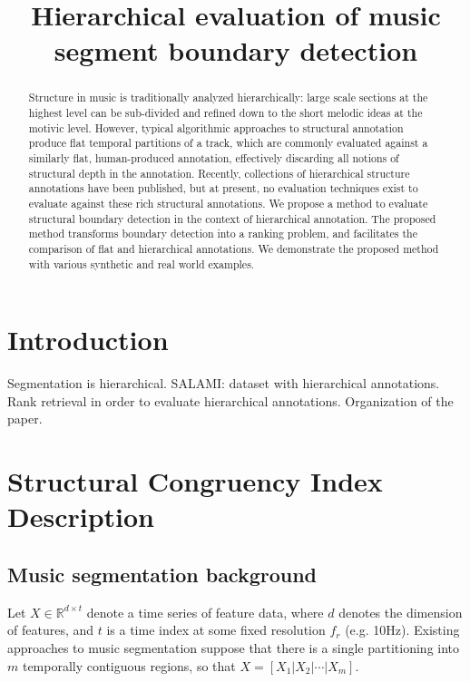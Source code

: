 \documentclass{article}
\title{Hierarchical evaluation of music segment boundary detection}
\begin{document}
%
\maketitle
%
\begin{abstract}
Structure in music is traditionally analyzed hierarchically: large scale sections at the highest level can be sub-divided and refined down to the short melodic ideas at the motivic level. 
However, typical algorithmic approaches to structural annotation produce flat temporal partitions of a track, which are commonly evaluated against a similarly flat, human-produced
annotation, effectively discarding all notions of structural depth in the annotation.
Recently, collections of hierarchical structure annotations have been published, but at present, no evaluation techniques exist to evaluate against these rich structural annotations.
We propose a method to evaluate structural boundary detection in the context of hierarchical annotation.
The proposed method transforms boundary detection into a ranking problem, and facilitates the comparison of flat and hierarchical annotations.
We demonstrate the proposed method with various synthetic and real world examples. 
\end{abstract}
%
\section{Introduction}\label{sec:introduction}

Segmentation is hierarchical.
SALAMI: dataset with hierarchical annotations.
Rank retrieval in order to evaluate hierarchical annotations.
Organization of the paper.

\section{Structural Congruency Index Description}\label{sec:eval_desc}

\subsection{Music segmentation background}

Let $X \in \mathbb{R}^{d\times t}$ denote a time series of feature data, where $d$ denotes the dimension of features, and $t$ is a time index at some fixed resolution $f_r$ (e.g. 10Hz).
Existing approaches to music segmentation suppose that there is a single partitioning into $m$ temporally contiguous regions, so that $X=[X_1|X_2|\cdots|X_m]$.
\end{document}
